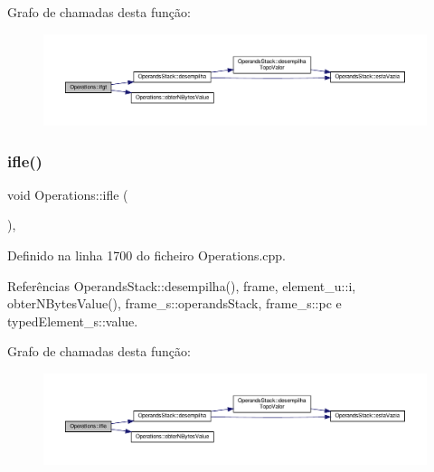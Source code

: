 Grafo de chamadas desta função\+:
\nopagebreak
\begin{figure}[H]
\begin{center}
\leavevmode
\includegraphics[width=350pt]{classOperations_afff52b972f58750ea8037aeb02dd22bc_cgraph}
\end{center}
\end{figure}
\mbox{\label{classOperations_a1ef1754372db2e5285a129389274dcc8}} 
\subsubsection{\texorpdfstring{ifle()}{ifle()}}
{\footnotesize\ttfamily void Operations\+::ifle (\begin{DoxyParamCaption}{ }\end{DoxyParamCaption})\hspace{0.3cm}{\ttfamily [static]}, {\ttfamily [private]}}



Definido na linha 1700 do ficheiro Operations.\+cpp.



Referências Operands\+Stack\+::desempilha(), frame, element\+\_\+u\+::i, obter\+N\+Bytes\+Value(), frame\+\_\+s\+::operands\+Stack, frame\+\_\+s\+::pc e typed\+Element\+\_\+s\+::value.

Grafo de chamadas desta função\+:
\nopagebreak
\begin{figure}[H]
\begin{center}
\leavevmode
\includegraphics[width=350pt]{classOperations_a1ef1754372db2e5285a129389274dcc8_cgraph}
\end{center}
\end{figure}
\mbox{\label{classOperations_a0a9460ea938fc3a9bbd2102578d50ee2}} 
